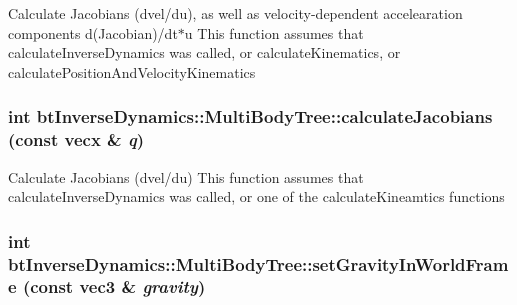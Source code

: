 Calculate Jacobians (dvel/du), as well as velocity-dependent accelearation components d(Jacobian)/dt$\ast$u This function assumes that calculateInverseDynamics was called, or calculateKinematics, or calculatePositionAndVelocityKinematics \hypertarget{classbt_inverse_dynamics_1_1_multi_body_tree_d036684dcd9a68f732bc37ba2a4ed894}{
\subsubsection[calculateJacobians]{\setlength{\rightskip}{0pt plus 5cm}int btInverseDynamics::MultiBodyTree::calculateJacobians (const vecx \& {\em q})}}
\label{classbt_inverse_dynamics_1_1_multi_body_tree_d036684dcd9a68f732bc37ba2a4ed894}


Calculate Jacobians (dvel/du) This function assumes that calculateInverseDynamics was called, or one of the calculateKineamtics functions \hypertarget{classbt_inverse_dynamics_1_1_multi_body_tree_103b593ab2c8759489fbf6673f664288}{
\subsubsection[setGravityInWorldFrame]{\setlength{\rightskip}{0pt plus 5cm}int btInverseDynamics::MultiBodyTree::setGravityInWorldFrame (const {\bf vec3} \& {\em gravity})}}
\label{classbt_inverse_dynamics_1_1_multi_body_tree_103b593ab2c8759489fbf6673f664288}


